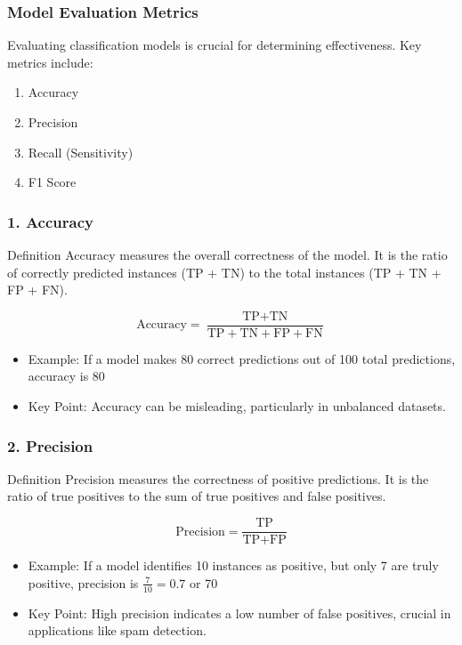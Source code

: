 \documentclass{beamer}
\begin{document}
\begin{frame}[fragile]
    \frametitle{Model Evaluation Metrics}
    Evaluating classification models is crucial for determining effectiveness. 
    Key metrics include:
    \begin{enumerate}
        \item Accuracy
        \item Precision
        \item Recall (Sensitivity)
        \item F1 Score
    \end{enumerate}
\end{frame}

\begin{frame}[fragile]
    \frametitle{1. Accuracy}
    \begin{block}{Definition}
    Accuracy measures the overall correctness of the model. It is the ratio of correctly predicted instances (TP + TN) to the total instances (TP + TN + FP + FN).
    \end{block}

    \begin{equation}
    \text{Accuracy} = \frac{\text{TP} + \text{TN}}{\text{TP} + \text{TN} + \text{FP} + \text{FN}}
    \end{equation}
    
    \begin{itemize}
        \item Example: If a model makes 80 correct predictions out of 100 total predictions, accuracy is 80%
        \item Key Point: Accuracy can be misleading, particularly in unbalanced datasets.
    \end{itemize}
\end{frame}

\begin{frame}[fragile]
    \frametitle{2. Precision}
    \begin{block}{Definition}
    Precision measures the correctness of positive predictions. It is the ratio of true positives to the sum of true positives and false positives.
    \end{block}

    \begin{equation}
    \text{Precision} = \frac{\text{TP}}{\text{TP} + \text{FP}}
    \end{equation}
    
    \begin{itemize}
        \item Example: If a model identifies 10 instances as positive, but only 7 are truly positive, precision is \( \frac{7}{10} = 0.7 \) or 70%
        \item Key Point: High precision indicates a low number of false positives, crucial in applications like spam detection.
    \end{itemize}
\end{frame}
\end{document}
